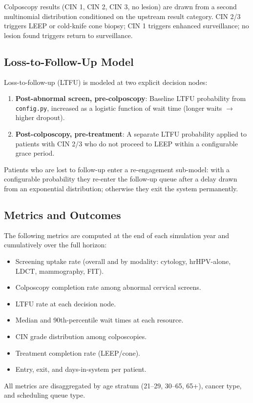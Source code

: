 \documentclass[12pt]{article}
\begin{document}
\vspace{0.5em}
Colposcopy results (CIN 1, CIN 2, CIN 3, no lesion) are drawn from
a second multinomial distribution conditioned on the upstream result
category.
CIN 2/3 triggers LEEP or cold-knife cone biopsy; CIN 1 triggers
enhanced surveillance; no lesion found triggers return to surveillance.

\subsection{Loss-to-Follow-Up Model}

Loss-to-follow-up (LTFU) is modeled at two explicit decision nodes:
\begin{enumerate}[leftmargin=2em]
  \item \textbf{Post-abnormal screen, pre-colposcopy}: Baseline LTFU
        probability from \texttt{config.py}, increased as a logistic
        function of wait time (longer waits $\to$ higher dropout).
  \item \textbf{Post-colposcopy, pre-treatment}: A separate LTFU
        probability applied to patients with CIN 2/3 who do not proceed
        to LEEP within a configurable grace period.
\end{enumerate}
Patients who are lost to follow-up enter a re-engagement sub-model:
with a configurable probability they re-enter the follow-up queue after
a delay drawn from an exponential distribution; otherwise they exit the
system permanently.

\subsection{Metrics and Outcomes}

The following metrics are computed at the end of each simulation year
and cumulatively over the full horizon:
\begin{itemize}[leftmargin=2em]
  \item Screening uptake rate (overall and by modality: cytology,
        hrHPV-alone, LDCT, mammography, FIT).
  \item Colposcopy completion rate among abnormal cervical screens.
  \item LTFU rate at each decision node.
  \item Median and 90th-percentile wait times at each resource.
  \item CIN grade distribution among colposcopies.
  \item Treatment completion rate (LEEP/cone).
  \item Entry, exit, and days-in-system per patient.
\end{itemize}
All metrics are disaggregated by age stratum (21--29, 30--65, 65+),
cancer type, and scheduling queue type.
\end{document}
